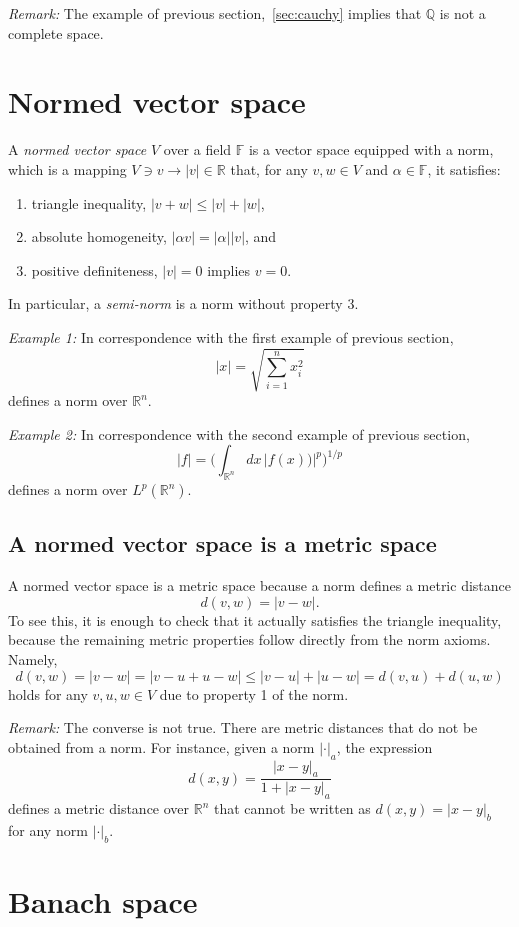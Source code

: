 \documentclass[aps,prl,twocolumn,groupedaddress]{revtex4-2}
\newcommand{\FF}{\mathbb{F}}
\newcommand{\QQ}{\mathbb{Q}}
\newcommand{\RR}{\mathbb{R}}
\begin{document}
{\em Remark:}
The example of previous section,~\ref{sec:cauchy} implies that $\QQ$ is not a complete space.

\section{Normed vector space}

A {\em normed vector space} $V$ over a field $\FF$ is a vector space equipped with a norm, which is a mapping $V\ni v\to |v|\in \RR$ that, for any $v,w\in V$ and $\alpha\in \FF$, it satisfies:
\begin{enumerate}
\item triangle inequality, $|v+w|\leq |v|+|w|$,
\item absolute homogeneity, $|\alpha v|=|\alpha||v|$, and
\item positive definiteness, $|v|=0$ implies $v=0$.
\end{enumerate}
In particular, a {\em semi-norm} is a norm without property 3.

{\em Example 1:}
In correspondence with the first example of previous section,
$$
|x| = \sqrt{\sum_{i=1}^n x_i^2}
$$
defines a norm over $\RR^n$.

{\em Example 2:}
In correspondence with the second example of previous section,
$$
|f| 
= 
\bigg(
\int_{\RR^n}
dx\,
|f(x))|^p
\bigg)^{1/p}
$$
defines a norm over $L^p(\RR^n)$.

\subsection{A normed vector space is a metric space}

A normed vector space is a metric space because a norm defines a metric distance
$$
d(v,w) = |v-w|.
$$
To see this, it is enough to check that it actually satisfies the triangle inequality, because the remaining metric properties follow directly from the norm axioms.
Namely,
$$
d(v,w) = |v-w| = |v-u+u-w| \leq |v-u|+|u-w| = d(v,u) + d(u,w)
$$
holds for any $v,u,w\in V$ due to property 1 of the norm.

{\em Remark:}
The converse is not true.
There are metric distances that do not be obtained from a norm.
For instance, given a norm $|\cdot|_a$, the expression
$$
d(x,y)
=
\frac{|x-y|_a}{1+|x-y|_a}
$$
defines a metric distance over $\RR^n$ that cannot be written as $d(x,y)=|x-y|_b$ for any norm $|\cdot|_b$.

\section{Banach space}
\end{document}
